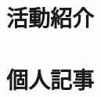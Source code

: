 \documentclass[a5paper,openary]{jsbook}%
\begin{document}


\frontmatter




\tableofcontents


\mainmatter
\let\originalchapter=\chapter
\def\chapter{\let\cleardoublepage\clearpage\originalchapter}


\pagestyle{fancy}
\fancyhf{}
\renewcommand{\sectionmark}[1]{\markboth{\thesection #1}{}}
\renewcommand{\subsectionmark}[1]{\markright{\thesubsection #1}}
\fancyhead{\gdef\headrulewidth{.0pt}}
\fancyhead[ER]{\leftmark}
\fancyhead[EL]{\thepage}
\fancyhead[OL]{\rightmark}
\fancyhead[OR]{\thepage}
\cfoot{}

\part{活動紹介}\label{Part:Katsudo}



\afterpage{\blankpage}

\part{個人記事}\label{Part:KOJIN}



\backmatter


\end{document}
